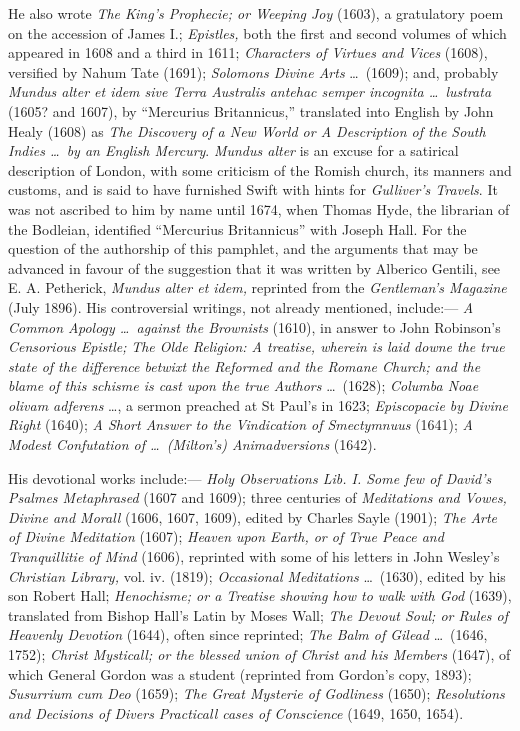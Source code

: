 He also wrote \emph{The King’s Prophecie; or Weeping Joy} (1603), a gratulatory poem on the accession of James I.; \emph{Epistles,} both the first and second volumes of which appeared in 1608 and a third in 1611; \emph{Characters of Virtues and Vices} (1608), versified by Nahum Tate (1691); \emph{Solomons Divine Arts} \ldots\ (1609); and, probably \emph{Mundus alter et idem sive Terra Australis antehac semper incognita \ldots\ lustrata} (1605? and 1607), by ``Mercurius Britannicus,'' translated into English by John Healy (1608) as \emph{The Discovery of a New World or A Description of the South Indies \ldots\ by an English Mercury}. \emph{Mundus alter} is an excuse for a satirical description of London, with some criticism of the Romish church, its manners and customs, and is said to have furnished Swift with hints for \emph{Gulliver's Travels}. It was not ascribed to him by name until 1674, when Thomas Hyde, the librarian of the Bodleian, identified ``Mercurius Britannicus'' with Joseph Hall. For the question of the authorship of this pamphlet, and the arguments that may be advanced in favour of the suggestion that it was written by Alberico Gentili, see E. A. Petherick, \emph{Mundus alter et idem,} reprinted from the \emph{Gentleman’s Magazine} (July 1896). His controversial writings, not already mentioned, include:--- \emph{A Common Apology \ldots\ against the Brownists} (1610), in answer to John Robinson’s \emph{Censorious Epistle;} \emph{The Olde Religion: A treatise, wherein is laid downe the true state of the difference betwixt the Reformed and the Romane Church; and the blame of this schisme is cast upon the true Authors} \ldots\ (1628); \emph{Columba Noae olivam adferens} \ldots, a sermon preached at St Paul's in 1623; \emph{Episcopacie by Divine Right} (1640); \emph{A Short Answer to the Vindication of Smectymnuus} (1641); \emph{A Modest Confutation of \ldots\ (Milton's) Animadversions} (1642).

His devotional works include:--- \emph{Holy Observations Lib. I. Some few of David’s Psalmes Metaphrased} (1607 and 1609); three centuries of \emph{Meditations and Vowes, Divine and Morall} (1606, 1607, 1609), edited by Charles Sayle (1901); \emph{The Arte of Divine Meditation} (1607); \emph{Heaven upon Earth, or of True Peace and Tranquillitie of Mind} (1606), reprinted with some of his letters in John Wesley's \emph{Christian Library,} vol. iv. (1819); \emph{Occasional Meditations} \ldots\ (1630), edited by his son Robert Hall; \emph{Henochisme; or a Treatise showing how to walk with God} (1639), translated from Bishop Hall's Latin by Moses Wall; \emph{The Devout Soul; or Rules of Heavenly Devotion} (1644), often since reprinted; \emph{The Balm of Gilead} \ldots\ (1646, 1752); \emph{Christ Mysticall; or the blessed union of Christ and his Members} (1647), of which General Gordon was a student (reprinted from Gordon's copy, 1893); \emph{Susurrium cum Deo} (1659); \emph{The Great Mysterie of Godliness} (1650); \emph{Resolutions and Decisions of Divers Practicall cases of Conscience} (1649, 1650, 1654).

